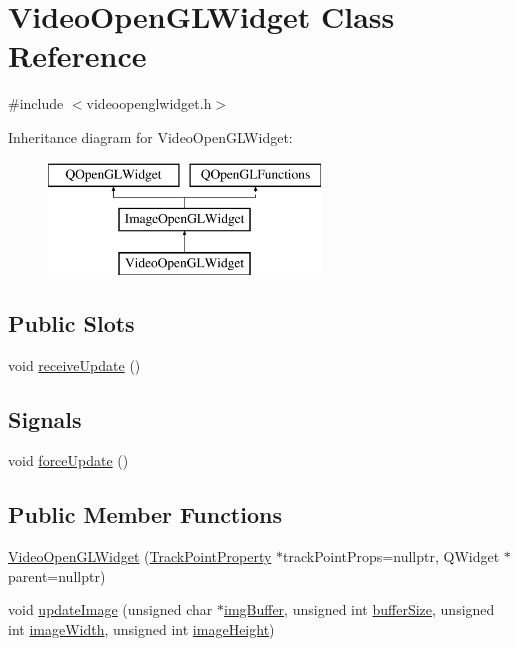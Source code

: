 \hypertarget{class_video_open_g_l_widget}{}\section{Video\+Open\+G\+L\+Widget Class Reference}
\label{class_video_open_g_l_widget}


{\ttfamily \#include $<$videoopenglwidget.\+h$>$}

Inheritance diagram for Video\+Open\+G\+L\+Widget\+:\begin{figure}[H]
\begin{center}
\leavevmode
\includegraphics[height=3.000000cm]{class_video_open_g_l_widget}
\end{center}
\end{figure}
\subsection*{Public Slots}
\begin{DoxyCompactItemize}
\item 
void \mbox{\hyperlink{class_video_open_g_l_widget_a1837ee1283b850d2691a7bc2d053bdaa}{receive\+Update}} ()
\end{DoxyCompactItemize}
\subsection*{Signals}
\begin{DoxyCompactItemize}
\item 
void \mbox{\hyperlink{class_video_open_g_l_widget_a20d8fbc614586662f3e032575da4cb5b}{force\+Update}} ()
\end{DoxyCompactItemize}
\subsection*{Public Member Functions}
\begin{DoxyCompactItemize}
\item 
\mbox{\hyperlink{class_video_open_g_l_widget_acd18162e70ad5cb55fc5ad53c590651b}{Video\+Open\+G\+L\+Widget}} (\mbox{\hyperlink{struct_track_point_property}{Track\+Point\+Property}} $\ast$track\+Point\+Props=nullptr, Q\+Widget $\ast$parent=nullptr)
\item 
void \mbox{\hyperlink{class_video_open_g_l_widget_a116b4ee59731f274ba190167e9a91283}{update\+Image}} (unsigned char $\ast$\mbox{\hyperlink{class_image_open_g_l_widget_a52ca337428d317ca2765cdf4d95e1b43}{img\+Buffer}}, unsigned int \mbox{\hyperlink{class_image_open_g_l_widget_a2c22ecc7b2355c66ed8d7ca6d824404e}{buffer\+Size}}, unsigned int \mbox{\hyperlink{class_image_open_g_l_widget_a8c3fbf15ba41c21741f8916079f5b6c3}{image\+Width}}, unsigned int \mbox{\hyperlink{class_image_open_g_l_widget_a30f0fce34d5d14972dce2c2d534aa692}{image\+Height}})
\end{DoxyCompactItemize}
